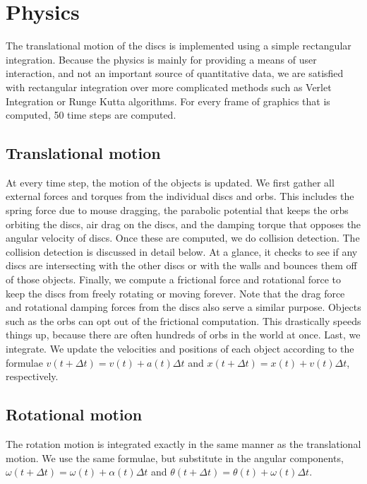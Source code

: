 \documentclass[pdftext,twoside,10pt]{article}
\begin{document}
\vspace{1cm}


\section{Physics}
The translational motion of the discs is implemented using a simple rectangular integration. Because the physics is mainly for providing a means of user interaction, and not an important source of quantitative data, we are satisfied with rectangular integration over more complicated methods such as Verlet Integration or Runge Kutta algorithms. For every frame of graphics that is computed, 50 time steps are computed.

\subsection{Translational motion}
At every time step, the motion of the objects is updated. We first gather all external forces and torques from the individual discs and orbs. This includes the spring force due to mouse dragging, the parabolic potential that keeps the orbs orbiting the discs, air drag on the discs, and the damping torque that opposes the angular velocity of discs. Once these are computed, we do collision detection. The collision detection is discussed in detail below. At a glance, it checks to see if any discs are intersecting with the other discs or with the walls and bounces them off of those objects. Finally, we compute a frictional force and rotational force to keep the discs from freely rotating or moving forever. Note that the drag force and rotational damping forces from the discs also serve a similar purpose. Objects such as the orbs can opt out of the frictional computation. This drastically speeds things up, because there are often hundreds of orbs in the world at once. Last, we integrate. We update the velocities and positions of each object according to the formulae  $v(t + \Delta t) = v(t) + a(t)\Delta t$ and  $x(t + \Delta t) = x(t) + v(t)\Delta t$, respectively.

\subsection{Rotational motion}
The rotation motion is integrated exactly in the same manner as the translational motion. We use the same formulae, but substitute in the angular components, $\omega(t + \Delta t) = \omega(t) + \alpha(t)\Delta t$ and  $\theta(t + \Delta t) = \theta(t) + \omega(t)\Delta t$.
\end{document}
